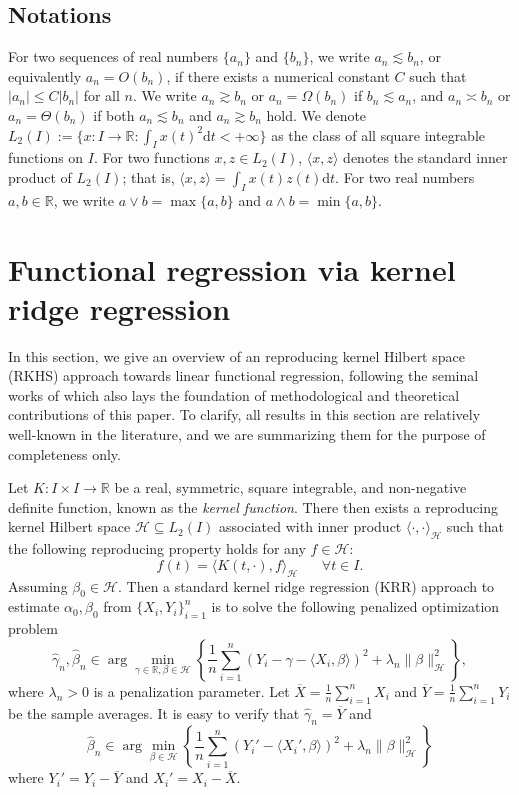 \documentclass[aos]{imsart}
\renewcommand{\hat}{\widehat}
\renewcommand{\bar}{\overline}
\newcommand{\ud}{\mathrm d}
\newcommand{\mH}{\mathcal H}
\theoremstyle{plain}
\theoremstyle{definition}
\theoremstyle{definition}
\begin{document}
\subsection{Notations}

For two sequences of real numbers $\{a_n\}$ and $\{b_n\}$, we write $a_n\lesssim b_n$, or equivalently $a_n=O(b_n)$, if there exists a numerical constant $C$ such that $|a_n|\leq C|b_n|$ for all $n$.
We write $a_n\gtrsim b_n$ or $a_n=\Omega(b_n)$ if $b_n\lesssim a_n$, and $a_n\asymp b_n$ or $a_n=\Theta(b_n)$ if both $a_n\lesssim b_n$ and $a_n\gtrsim b_n$ hold.
We denote $L_2(I):=\{x: I\to\mathbb R: \int_I x(t)^2\ud t<+\infty\}$ as the class of all square integrable functions on $I$.
For two functions $x,z\in L_2(I)$, $\langle x,z\rangle$ denotes the standard inner product of $L_2(I)$; that is, $\langle x,z\rangle = \int_I x(t)z(t)\ud t$.
For two real numbers $a,b\in\mathbb R$, we write $a\vee b=\max\{a,b\}$ and $a\wedge b=\min\{a,b\}$.

\section{Functional regression via kernel ridge regression}

In this section, we give an overview of an reproducing kernel Hilbert space (RKHS) approach towards linear functional regression, following the seminal works of \cite{cai2012minimax} which also lays the foundation of 
methodological and theoretical contributions of this paper.
To clarify, all results in this section are relatively well-known in the literature, and we are summarizing them for the purpose of completeness only.

Let $K:I\times I\to\mathbb R$ be a real, symmetric, square integrable, and non-negative definite function, known as the \emph{kernel function}.
There then exists a reproducing kernel Hilbert space $\mH\subseteq L_2(I)$ associated with inner product $\langle\cdot,\cdot\rangle_{\mH}$
such that the following reproducing property holds for any $f\in\mH$:
$$
f(t) = \langle K(t,\cdot), f\rangle_{\mH}\;\;\;\;\;\;\forall t\in I.
$$
Assuming $\beta_0\in\mH$. Then a standard kernel ridge regression (KRR) approach to estimate $\alpha_0,\beta_0$ from $\{X_i,Y_i\}_{i=1}^n$ is to solve the following penalized optimization problem
\begin{equation}
\hat\gamma_n,\hat\beta_n \in \arg\min_{\gamma\in\mathbb R,\beta\in\mH} \left\{\frac{1}{n}\sum_{i=1}^n (Y_i-\gamma-\langle X_i,\beta\rangle)^2 + \lambda_n \|\beta\|_\mH^2\right\},
\label{eq:krr}
\end{equation}
where $\lambda_n>0$ is a penalization parameter.
Let $\bar X=\frac{1}{n}\sum_{i=1}^n X_i$ and $\bar Y=\frac{1}{n}\sum_{i=1}^n Y_i$ be the sample averages. It is easy to verify that $\hat\gamma_n=\bar Y$ and 
\begin{equation}
\hat\beta_n\in\arg\min_{\beta\in\mH}\left\{\frac{1}{n}\sum_{i=1}^n (Y_i'-\langle X_i',\beta\rangle)^2 + \lambda_n\|\beta\|_\mH^2\right\}
\label{eq:krr-nointercept}
\end{equation}
where $Y_i'=Y_i-\bar Y$ and $X_i'=X_i-\bar X$.
\end{document}
